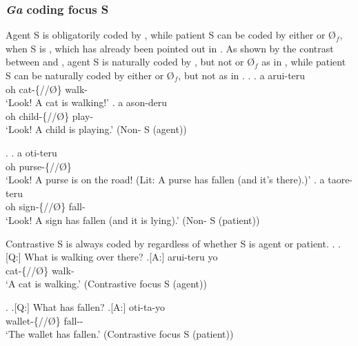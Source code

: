 

\subsubsection{\textit{Ga} coding focus S}

Agent S is obligatorily coded by ,
while patient S can be coded by either  or {\O$_{f}$},
when S is ,
which has already been pointed out in .
As shown by the contrast between \Next and \NNext,
agent S is naturally coded by ,
but not  or {\O$_{f}$} as in \Next,
while patient S can be naturally coded by either  or {\O$_{f}$},
but not  as in \NNext.
%
\ex.\label{ExAgentS}
	\ag. a  arui-teru \\
	oh cat-\{//\O\} walk- \\
	`Look! A cat is walking!'
	\bg. a  ason-deru \\
		oh child-\{//\O\} play- \\
		`Look! A child is playing.' \hfill{(Non- S (agent))}

\ex.\label{ExPatientS}
	\ag. a  oti-teru \\
		oh purse-\{//\O\} \\
		`Look! A purse is on the road! (Lit: A purse has fallen (and it's there).)'
	\bg. a  taore-teru \\
		oh sign-\{//\O\} fall- \\
		`Look! A sign has fallen (and it is lying).' \hfill{(Non- S (patient))}


Contrastive S is always coded by 
regardless of whether S is agent or patient.
%
\ex.
 \a.[Q:] What is walking over there?
 \bg.[A:]  arui-teru yo \\
	cat-\{//\O\} walk-  \\
	`A cat is walking.' \hfill{(Contrastive focus S (agent))}

\ex. \a.[Q:] What has fallen?
	\bg.[A:]  oti-ta-yo \\
			wallet-\{//\O\} fall-- \\
			`The wallet has fallen.' \hfill{(Contrastive focus S (patient))}

